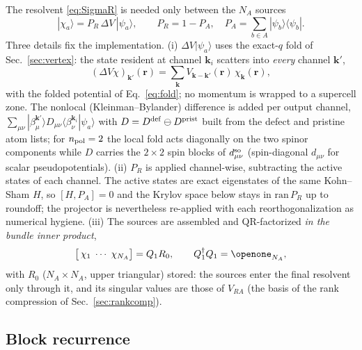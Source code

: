\documentclass[aps,prx,reprint,superscriptaddress,nofootinbib,longbibliography]{revtex4-2}
\newcommand{\dV}{\Delta V}
\newcommand{\kk}{\mathbf{k}}
\newcommand{\rr}{\mathbf{r}}
\begin{document}
The resolvent \eqref{eq:SigmaR} is needed only between the $N_A$ sources
\begin{equation}
  |\chi_a\rangle = P_R\, \dV\, |\psi_a\rangle ,
  \qquad P_R = 1-P_A,\quad
  P_A=\sum_{b\in A}|\psi_b\rangle\langle\psi_b| .
  \label{eq:source}
\end{equation}
Three details fix the implementation.
(i) $\dV|\psi_a\rangle$ uses the exact-$q$ fold of Sec.~\ref{sec:vertex}: the
state resident at channel $\kk_i$ scatters into \emph{every} channel $\kk'$,
\begin{equation}
  (\dV\chi)_{\kk'}(\rr)=\sum_{\kk}V_{\kk-\kk'}(\rr)\,\chi_{\kk}(\rr),
  \label{eq:applydV}
\end{equation}
with the folded potential of Eq.~\eqref{eq:fold}; no momentum is wrapped to
a supercell zone. The nonlocal
(Kleinman--Bylander) difference is added per output channel,
$\sum_{\mu\nu}|\beta^{\kk'}_{\mu}\rangle D_{\mu\nu}
\langle\beta^{\kk_i}_{\nu}|\psi_a\rangle$ with
$D=D^{\rm def}\ominus D^{\rm prist}$ built from the defect and pristine atom
lists; for $n_{\rm pol}=2$ the local fold acts diagonally on the two spinor
components while $D$ carries the $2\times2$ spin blocks of
$d^{\rm so}_{\mu\nu}$ (spin-diagonal $d_{\mu\nu}$ for scalar
pseudopotentials).
(ii) $P_R$ is applied channel-wise, subtracting the active states of each
channel. The active states are exact eigenstates of the same Kohn--Sham $H$,
so $[H,P_A]=0$ and the Krylov space below stays in $\mathrm{ran}\,P_R$ up to
roundoff; the projector is nevertheless re-applied with each
reorthogonalization as numerical hygiene.
(iii) The sources are assembled and QR-factorized \emph{in the bundle inner
product},
\begin{equation}
  \big[\,\chi_1\;\cdots\;\chi_{N_A}\big] = Q_1 R_0 ,
  \qquad Q_1^{\dagger}Q_1=\openone_{N_A},
  \label{eq:qr0}
\end{equation}
with $R_0$ ($N_A{\times}N_A$, upper triangular) stored: the sources enter the
final resolvent only through it, and its singular values are those of
$V_{RA}$ (the basis of the rank compression of Sec.~\ref{sec:rankcomp}).

\subsection{Block recurrence}
\end{document}
